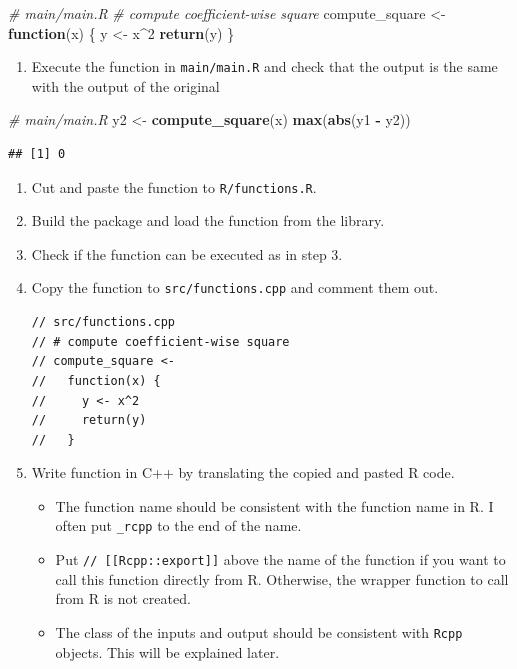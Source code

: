 \documentclass[]{book}
\newenvironment{Shaded}{\begin{snugshade}}{\end{snugshade}}
\newcommand{\KeywordTok}[1]{\textcolor[rgb]{0.13,0.29,0.53}{\textbf{#1}}}
\newcommand{\DecValTok}[1]{\textcolor[rgb]{0.00,0.00,0.81}{#1}}
\newcommand{\StringTok}[1]{\textcolor[rgb]{0.31,0.60,0.02}{#1}}
\newcommand{\CommentTok}[1]{\textcolor[rgb]{0.56,0.35,0.01}{\textit{#1}}}
\newcommand{\ControlFlowTok}[1]{\textcolor[rgb]{0.13,0.29,0.53}{\textbf{#1}}}
\newcommand{\OperatorTok}[1]{\textcolor[rgb]{0.81,0.36,0.00}{\textbf{#1}}}
\newcommand{\NormalTok}[1]{#1}
\providecommand{\tightlist}{%
  \setlength{\itemsep}{0pt}\setlength{\parskip}{0pt}}
\begin{document}
\begin{Shaded}
\begin{Highlighting}[]
\CommentTok{# main/main.R}
\CommentTok{# compute coefficient-wise square}
\NormalTok{compute_square <-}
\StringTok{  }\ControlFlowTok{function}\NormalTok{(x) \{}
\NormalTok{    y <-}\StringTok{ }\NormalTok{x}\OperatorTok{^}\DecValTok{2}
    \KeywordTok{return}\NormalTok{(y)}
\NormalTok{  \}}
\end{Highlighting}
\end{Shaded}

\begin{enumerate}
\def\labelenumi{\arabic{enumi}.}
\setcounter{enumi}{2}
\tightlist
\item
  Execute the function in \texttt{main/main.R} and check that the output
  is the same with the output of the original
\end{enumerate}

\begin{Shaded}
\begin{Highlighting}[]
\CommentTok{# main/main.R}
\NormalTok{y2 <-}\StringTok{ }\KeywordTok{compute_square}\NormalTok{(x)}
\KeywordTok{max}\NormalTok{(}\KeywordTok{abs}\NormalTok{(y1 }\OperatorTok{-}\StringTok{ }\NormalTok{y2))}
\end{Highlighting}
\end{Shaded}

\begin{verbatim}
## [1] 0
\end{verbatim}

\begin{enumerate}
\def\labelenumi{\arabic{enumi}.}
\setcounter{enumi}{3}
\item
  Cut and paste the function to \texttt{R/functions.R}.
\item
  Build the package and load the function from the library.
\item
  Check if the function can be executed as in step 3.
\item
  Copy the function to \texttt{src/functions.cpp} and comment them out.

\begin{verbatim}
// src/functions.cpp
// # compute coefficient-wise square
// compute_square <-
//   function(x) {
//     y <- x^2
//     return(y)
//   }
\end{verbatim}
\item
  Write function in C++ by translating the copied and pasted R code.

  \begin{itemize}
  \tightlist
  \item
    The function name should be consistent with the function name in R.
    I often put \texttt{\_rcpp} to the end of the name.
  \item
    Put \texttt{//\ {[}{[}Rcpp::export{]}{]}} above the name of the
    function if you want to call this function directly from R.
    Otherwise, the wrapper function to call from R is not created.
  \item
    The class of the inputs and output should be consistent with
    \texttt{Rcpp} objects. This will be explained later.
  \end{itemize}
\end{enumerate}
\end{document}
